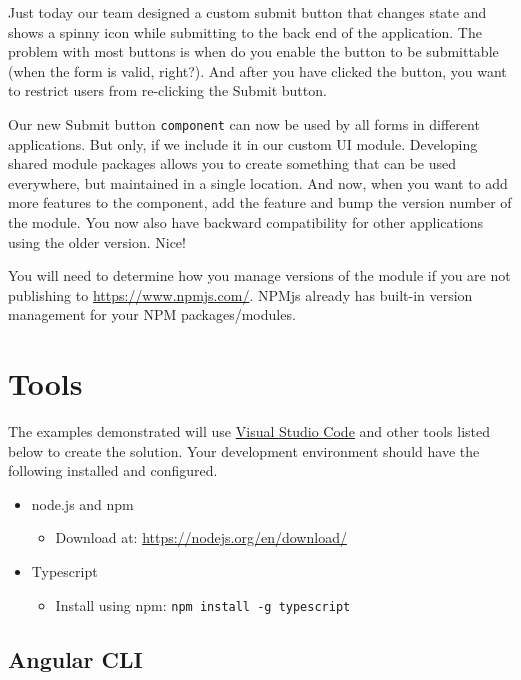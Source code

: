 \documentclass[]{book}
\providecommand{\tightlist}{%
  \setlength{\itemsep}{0pt}\setlength{\parskip}{0pt}}
\theoremstyle{definition}
\theoremstyle{definition}
\theoremstyle{definition}
\theoremstyle{remark}
\begin{document}
Just today our team designed a custom submit button that changes state
and shows a spinny icon while submitting to the back end of the
application. The problem with most buttons is when do you enable the
button to be submittable (when the form is valid, right?). And after you
have clicked the button, you want to restrict users from re-clicking the
Submit button.

Our new Submit button \texttt{component} can now be used by all forms in
different applications. But only, if we include it in our custom UI
module. Developing shared module packages allows you to create something
that can be used everywhere, but maintained in a single location. And
now, when you want to add more features to the component, add the
feature and bump the version number of the module. You now also have
backward compatibility for other applications using the older version.
Nice!

You will need to determine how you manage versions of the module if you
are not publishing to \url{https://www.npmjs.com/}. NPMjs already has
built-in version management for your NPM packages/modules.

\chapter{Tools}\label{tools}

The examples demonstrated will use
\href{https://code.visualstudio.com/download}{Visual Studio Code} and
other tools listed below to create the solution. Your development
environment should have the following installed and configured.

\begin{itemize}
\tightlist
\item
  node.js and npm

  \begin{itemize}
  \tightlist
  \item
    Download at: \url{https://nodejs.org/en/download/}
  \end{itemize}
\item
  Typescript

  \begin{itemize}
  \tightlist
  \item
    Install using npm: \texttt{npm\ install\ -g\ typescript}
  \end{itemize}
\end{itemize}

\section{Angular CLI}\label{angular-cli}
\end{document}
